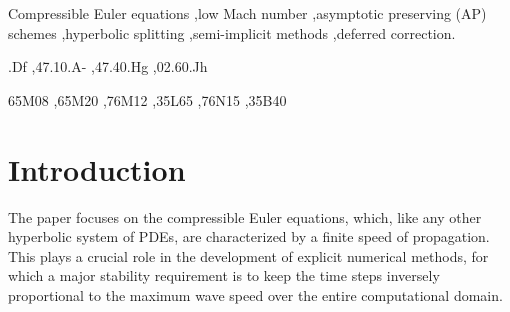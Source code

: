 \documentclass[preprint,12pt]{elsarticle}
\begin{document}
\begin{frontmatter}
\begin{abstract}
Numerical experiments confirm that the proposed AP scheme achieves the expected second order of accuracy and that the time-step constraint
is independent of the Mach number, making it a robust and efficient alternative to conventional explicit methods.
\end{abstract}

%

\begin{keyword}
Compressible Euler equations \sep low Mach number \sep asymptotic preserving (AP) schemes \sep hyperbolic splitting \sep semi-implicit
methods \sep deferred correction.


.Df \sep 47.10.A- \sep 47.40.Hg \sep 02.60.Jh

\MSC 65M08 \sep 65M20 \sep 76M12 \sep 35L65 \sep 76N15 \sep 35B40

\end{keyword}

\end{frontmatter}



\section{Introduction}
The paper focuses on the compressible Euler equations, which, like any other hyperbolic system of PDEs, are characterized by a finite speed
of propagation. This plays a crucial role in the development of explicit numerical methods, for which a major stability requirement is to
keep the time steps inversely proportional to the maximum wave speed over the entire computational domain.
\end{document}
